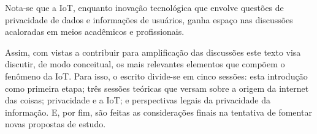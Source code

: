 Nota-se que a IoT, enquanto inovação tecnológica que envolve questões de privacidade de dados e informações de usuários, ganha espaço nas discussões acaloradas em meios acadêmicos e profissionais.

Assim, com vistas a contribuir para amplificação das discussões este texto visa discutir, de modo conceitual, os mais relevantes elementos que compõem o fenômeno da IoT. Para isso, o escrito divide-se em cinco sessões: esta introdução como primeira etapa; três sessões teóricas que versam sobre a origem da internet das coisas; privacidade e a IoT; e perspectivas legais da privacidade da informação. E, por fim, são feitas as considerações finais na tentativa de fomentar novas propostas de estudo.	
